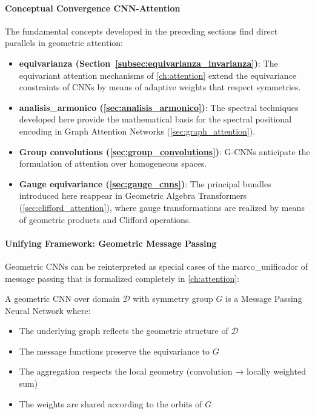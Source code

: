 \paragraph{Conceptual Convergence CNN-Attention}

The fundamental concepts developed in the preceding sections find direct parallels in geometric attention:

\begin{itemize}
\item \textbf{\gls{equivarianza} (Section~\ref{subsec:equivarianza_invarianza})}: The equivariant attention mechanisms of \autoref{ch:attention} extend the equivariance constraints of CNNs by means of adaptive weights that respect symmetries.

\item \textbf{\gls{analisis_armonico} (\autoref{sec:analisis_armonico})}: The spectral techniques developed here provide the mathematical basis for the spectral positional encoding in Graph Attention Networks (\autoref{sec:graph_attention}).

\item \textbf{Group convolutions (\autoref{sec:group_convolutions})}: G-CNNs anticipate the formulation of attention over homogeneous spaces.

\item \textbf{Gauge equivariance (\autoref{sec:gauge_cnns})}: The principal bundles introduced here reappear in Geometric Algebra Transformers (\autoref{sec:clifford_attention}), where gauge transformations are realized by means of geometric products and Clifford operations.
\end{itemize}

\paragraph{Unifying Framework: Geometric Message Passing}

Geometric CNNs can be reinterpreted as special cases of the \gls{marco_unificador} of message passing that is formalized completely in \autoref{ch:attention}:

\begin{definition}\label{def:cnn_as_structured_mp}
A geometric CNN over domain $\mathcal{D}$ with symmetry group $G$ is a Message Passing Neural Network where:
\begin{itemize}
    \item The underlying graph reflects the geometric structure of $\mathcal{D}$
    \item The message functions preserve the equivariance to $G$
    \item The aggregation respects the local geometry (convolution → locally weighted sum)
    \item The weights are shared according to the orbits of $G$
\end{itemize}
\end{definition}

